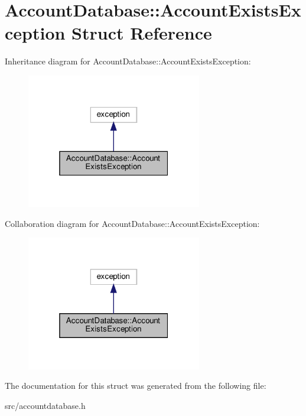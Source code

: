 \hypertarget{structAccountDatabase_1_1AccountExistsException}{}\section{Account\+Database\+:\+:Account\+Exists\+Exception Struct Reference}
\label{structAccountDatabase_1_1AccountExistsException}


Inheritance diagram for Account\+Database\+:\+:Account\+Exists\+Exception\+:
\nopagebreak
\begin{figure}[H]
\begin{center}
\leavevmode
\includegraphics[width=217pt]{structAccountDatabase_1_1AccountExistsException__inherit__graph}
\end{center}
\end{figure}


Collaboration diagram for Account\+Database\+:\+:Account\+Exists\+Exception\+:
\nopagebreak
\begin{figure}[H]
\begin{center}
\leavevmode
\includegraphics[width=217pt]{structAccountDatabase_1_1AccountExistsException__coll__graph}
\end{center}
\end{figure}


The documentation for this struct was generated from the following file\+:\begin{DoxyCompactItemize}
\item 
src/accountdatabase.\+h\end{DoxyCompactItemize}
